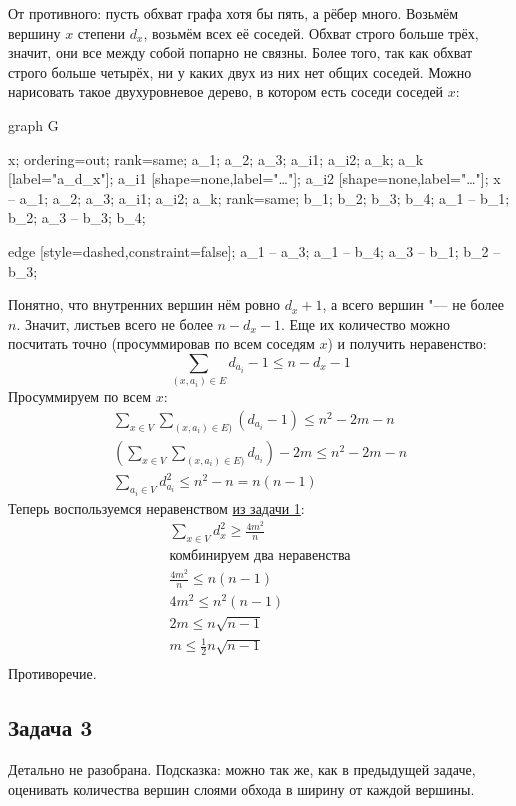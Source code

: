 	От противного: пусть обхват графа хотя бы пять, а рёбер много.
	Возьмём вершину $x$ степени $d_x$, возьмём всех её соседей.
	Обхват строго больше трёх, значит, они все между собой попарно не связны.
	Более того, так как обхват строго больше четырёх, ни у каких двух из них нет общих соседей.
	Можно нарисовать такое двухуровневое дерево, в котором есть соседи соседей $x$:
	\begin{center}
		\begin{dot2tex}[scale=0.8,options=-tmath]
			graph G {
				x;
				ordering=out;
				{rank=same; a_1; a_2; a_3; a_i1; a_i2; a_k};
				a_k [label="a_{d_x}"];
				a_i1 [shape=none,label="\dots"];
				a_i2 [shape=none,label="\dots"];
				x -- {a_1; a_2; a_3; a_i1; a_i2; a_k};
				{rank=same; b_1; b_2; b_3; b_4};
				a_1 -- {b_1; b_2};
				a_3 -- {b_3; b_4};

				edge [style=dashed,constraint=false];
				a_1 -- a_3;
				a_1 -- b_4;
				a_3 -- b_1;
				b_2 -- b_3;
			}
		\end{dot2tex}
	\end{center}
	Понятно, что внутренних вершин нём ровно $d_x+1$, а всего вершин "--- не более $n$.
	Значит, листьев всего не более $n-d_x-1$.
	Еще их количество можно посчитать точно (просуммировав по всем соседям $x$) и получить неравенство:
	\[ \sum_{(x, a_i) \in E} d_{a_i}-1 \le n - d_x - 1\]
	Просуммируем по всем $x$:
	\begin{gather*}
		\sum_{x \in V} \sum_{(x, a_i) \in E)} (d_{a_i}-1) \le n^2 - 2m - n \\
		\left(\sum_{x \in V} \sum_{(x, a_i) \in E)} d_{a_i}\right) - 2m \le n^2 - 2m - n \\
		\sum_{a_i \in V} d_{a_i}^2 \le n^2 - n = n(n-1)
	\end{gather*}
	Теперь воспользуемся неравенством \hyperref[day150416_class_prob1_ineq]{из задачи 1}:
	\begin{gather*}
		\sum_{x \in V} d_x^2 \ge \frac{4m^2}{n} \\
		\text{комбинируем два неравенства} \\
		\frac{4m^2}{n} \le n(n-1) \\
		4m^2 \le n^2(n-1) \\
		2m \le n\sqrt{n-1} \\
		m \le \frac 12 n\sqrt{n-1} \\
	\end{gather*}
	Противоречие.

\subsection{Задача 3}
	Детально не разобрана.
	Подсказка: можно так же, как в предыдущей задаче, оценивать количества вершин слоями обхода в ширину от каждой вершины.
